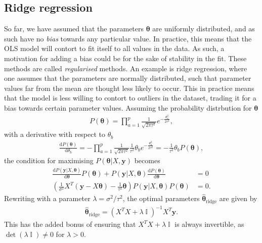 \documentclass[twocolumn,english,notitlepage]{article}
\renewcommand{\d}[2][x]{\ensuremath{\frac{\mathrm{d}#2}{\mathrm{d}#1}}}
\renewcommand{\vec}[1]{\boldsymbol{#1}}
\newcommand{\pclosed}[1]{\left(#1\right)}
\renewcommand{\exp}[1]{e^{#1}}
\DeclareMathOperator{\eye}{\mathbb{I}}
\newcommand{\msub}[2]{\ensuremath{{#1}_\text{#2}}}
\begin{document}
    \subsection{Ridge regression}
        So far, we have assumed that the parameters $\vec{\theta}$ are uniformly distributed, and as such have no \textit{bias} towards any particular value. In practice, this means that the OLS model will contort to fit itself to all values in the data. As such, a motivation for adding a bias could be for the sake of stability in the fit. These methods are called \textit{regularised} methods. An example is ridge regression, where one assumes that the parameters are normally distributed, such that parameter values far from the mean are thought less likely to occur. This in practice means that the model is less willing to contort to outliers in the dataset, trading it for a bias towards certain parameter values. Assuming the probability distrbution for $\vec{\theta}$
        \begin{align}
            P(\vec{\theta}) = \prod_{a=1}^{p} \frac{1}{\sqrt{2\pi\tau^2}} \exp{-\frac{\theta_a^2}{2\tau^2}},
        \end{align}
        with a derivative with respect to $\theta_b$
        \begin{align}
            \d[\theta_b]{P(\vec{\theta})} = -\prod_{a=1}^{p} \frac{1}{\sqrt{2\pi\tau^2}} \frac{1}{\tau^2} \theta_b \exp{-\frac{\theta_a^2}{2\tau^2}} = -\frac{1}{\tau^2} \theta_b P(\vec{\theta}),
        \end{align}
        the condition for maximising $P(\vec{\theta}|X, \vec{y})$ becomes
        \begin{align} \nonumber
            \d[\vec{\theta}]{P(\vec{y}|X, \vec{\theta})} P(\vec{\theta}) + P(\vec{y}|X, \vec{\theta}) \d[\vec{\theta}]{P(\vec{\theta})} &= 0 \\
            \pclosed{ \frac{1}{\sigma^2} X^T(\vec{y}-X\vec{\theta}) - \frac{1}{\tau^2} \vec{\theta} } P(\vec{y}|X,\vec{\theta}) P(\vec{\theta}) &= 0.
        \end{align}
        Rewriting with a parameter $\lambda = \sigma^2/\tau^2$, the optimal parameters $\msub{\vec{\hat{\theta}}}{ridge}$ are given by
        \begin{align}
            \boxed{
            \msub{\vec{\hat{\theta}}}{ridge} = \pclosed{X^TX + \lambda \eye}^{-1} X^T \vec{y}.
            }
        \end{align}
        This has the added bonus of ensuring that $X^TX + \lambda \eye$ is always invertible, as $\det(\lambda \eye) \neq 0$ for $\lambda>0$.
\end{document}

